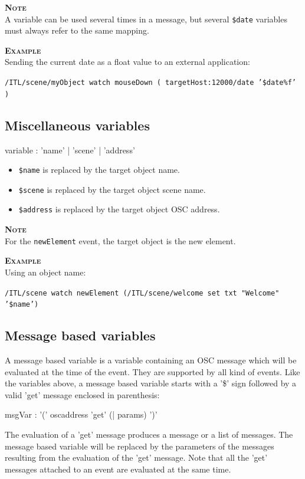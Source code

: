 \documentclass[a4paper,twoside]{report}
\newcommand{\subsublevel}[1]	{\subsection{#1}}
\newcommand{\OSC}[1]		{\texttt{#1}}
\newcommand{\example}		{\textbf{\hspace{-1.5cm}\textbf{\textsc{Example }}}}
\newcommand{\note}	[1]		{\vspace{2mm}\textbf{\hspace{-1.03cm}\textbf{\textsc{Note #1}}}}
\newcommand{\sample}	[1]			{\vspace{-2mm}\begin{center}\colorbox{mygrey}{
								\begin{minipage}[t]{0.9\columnwidth} 
								{\small \texttt{#1}}
								\end{minipage}}\end{center}}
\begin{document}
\note{} \\
A variable can be used several times in a message, but several \OSC{\$date} variables must always refer to the same mapping.

\example \\
Sending the current date as a float value to an external application:\\
\sample{/ITL/scene/myObject watch mouseDown ( targetHost:12000/date '\$date\%f' )}

\subsublevel{Miscellaneous variables}
\label{miscvar}

\begin{rail} 
variable :  'name' | 'scene' | 'address'
\end{rail}

\begin{itemize}
\item \OSC{\$name} is replaced by the target object name.
\item \OSC{\$scene} is replaced by the target object scene name.
\item \OSC{\$address} is replaced by the target object OSC address. 
\end{itemize}

\note{} \\
For the \OSC{newElement} event, the target object is the new element. 

\example \\
Using an object name:
\sample{/ITL/scene watch newElement (/ITL/scene/welcome set txt "Welcome" '\$name')}

\subsublevel{Message based variables}
\label{msgvar}

A message based variable is a variable containing an OSC message which will be evaluated at the time of the event. They are supported by all kind of events. Like  the variables above, a message based variable starts with a '\$' sign followed by a valid 'get' message enclosed in parenthesis:
\begin{rail} 
msgVar : '(' oscaddress 'get' (| params) ')'
\end{rail}

The evaluation of a 'get' message produces a message or a list of messages. The message based variable will be replaced by the parameters of the messages resulting from the evaluation of the 'get' message.
Note that all the 'get' messages attached to an event are evaluated at the same time.
\end{document}
